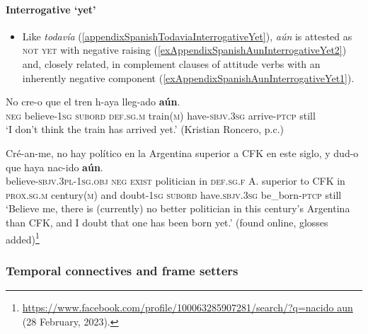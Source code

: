 \paragraph{Interrogative \lq yet\rq}
\label{appendixSpanishAunInterrogativeYet}
\begin{itemize}
	\item Like \textit{todavía} (\ref{appendixSpanishTodaviaInterrogativeYet}), \textit{aún} is attested as \textsc{not yet} with negative raising (\ref{exAppendixSpanishAunInterrogativeYet2}) and, closely related, in complement clauses of attitude verbs with an inherently negative component (\ref{exAppendixSpanishAunInterrogativeYet1}).
\end{itemize}
\begin{exe}
	\ex\label{exAppendixSpanishAunInterrogativeYet2}
	 \gll No cre-o que el tren h-aya lleg-ado \textbf{aún}.\\
	\textsc{neg} believe-1\textsc{sg} \textsc{subord} \textsc{def}.\textsc{sg}.\textsc{m} train(\textsc{m}) have-\textsc{sbjv}.3\textsc{sg} arrive-\textsc{ptcp} still\\
	\glt \lq I don't think the train has arrived yet.' (Kristian Roncero, p.c.)

	\ex \label{exAppendixSpanishAunInterrogativeYet1}
	\gll Cré-an-me, no hay político en la Argentina superior a CFK en este siglo, y dud-o que haya nac-ido \textbf{aún}.\\
	believe-\textsc{sbjv}.3\textsc{pl}-1\textsc{sg}.\textsc{obj} \textsc{neg} \textsc{exist} politician in \textsc{def}.\textsc{sg}.\textsc{f} A. superior to CFK in \textsc{prox}.\textsc{sg}.\textsc{m} century(\textsc{m}) and doubt-1\textsc{sg} \textsc{subord} have.\textsc{sbjv}.3\textsc{sg} be\_born-\textsc{ptcp} still\\
	\glt \lq Believe me, there is (currently) no better politician in this century's Argentina than CFK, and I doubt that one has been born yet.\rq{ }(found online, glosses added)\footnote{\url{https://www.facebook.com/profile/100063285907281/search/?q=nacido aun} (28 February, 2023).}
\end{exe}




\subsubsection{Temporal connectives and frame setters}
